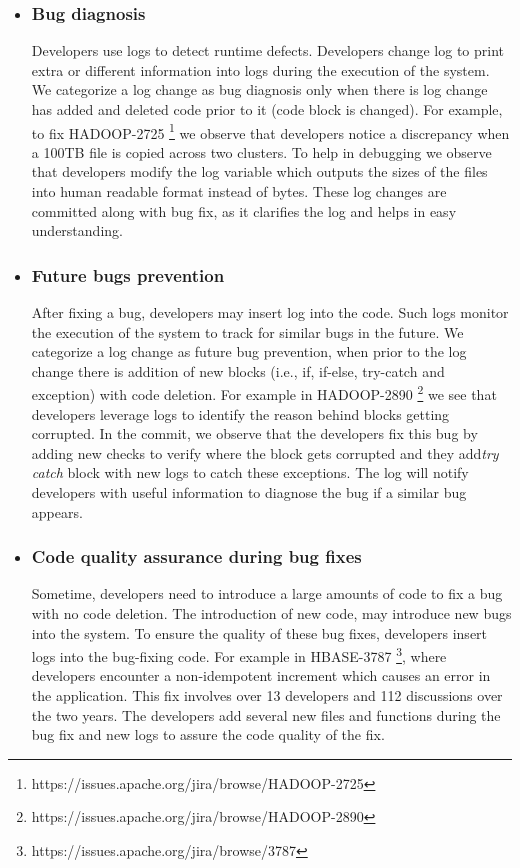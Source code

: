\begin{itemize}
	

\item \subsubsection*{Bug diagnosis} Developers use logs to detect runtime defects. Developers change log to print extra or different information into logs during the execution of the system. We categorize a log change as bug diagnosis only when there is log change has added and deleted code prior to it (code block is changed). For example, to fix HADOOP-2725 \footnote{https://issues.apache.org/jira/browse/HADOOP-2725} we observe that developers notice a discrepancy when a 100TB file is copied across two clusters. To help in debugging we observe that developers modify the log variable which outputs the sizes of the files into human readable format instead of bytes. These log changes are committed along with bug fix, as it clarifies the log and helps in easy understanding. %

\item \subsubsection*{Future bugs prevention} After fixing a bug, developers may insert log into the code. Such logs monitor the execution of the system to track for similar bugs in the future. We categorize a log change as future bug prevention, when prior to the log change there is addition of new blocks (i.e., if, if-else, try-catch and exception) with code deletion. For example in HADOOP-2890 \footnote{https://issues.apache.org/jira/browse/HADOOP-2890} we see that developers leverage logs to identify the reason behind blocks getting corrupted. In the commit, we observe that the developers fix this bug by adding new checks to verify where the block gets corrupted and they add\textsl{try catch} block with new logs to catch these exceptions. The log will notify developers with useful information to diagnose the bug if a similar bug appears.

\item \subsubsection*{Code quality assurance during bug fixes} Sometime, developers need to introduce a large amounts of code to fix a bug with no code deletion. The introduction of new code, may introduce new bugs into the system. To ensure the quality of these bug fixes, developers insert logs into the bug-fixing code. For example in HBASE-3787 \footnote{https://issues.apache.org/jira/browse/3787}, where developers encounter a non-idempotent increment which causes an error in the application. This fix involves over 13 developers and 112 discussions over the two years. The developers add several new files and functions during the bug fix and new logs to assure the code quality of the fix. 

\end{itemize}
